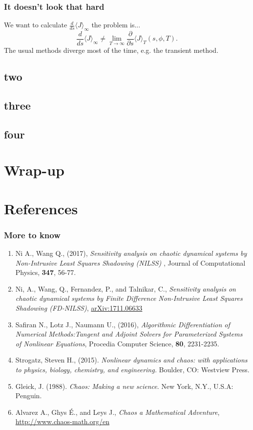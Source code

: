 \documentclass{beamer}
\begin{document}
\begin{frame}
  \frametitle{It doesn't look that hard}
  We want to calculate $\frac{d}{ds}\langle J \rangle_\infty $ the problem is...\pause
  \begin{equation}
    \frac{d}{ds} \langle J \rangle_\infty \neq \lim_{T\rightarrow \infty} \frac{\partial}{\partial s} \langle J \rangle_T (s,\phi,T).
  \end{equation}
  \pause
  The usual methods diverge most of the time, e.g. the transient method.
\end{frame}
\subsection{two}
\subsection{three}
\subsection{four}

\section{Wrap-up}

\section{References}
\begin{frame}
  \frametitle{More to know}
  \begin{scriptsize}
  \begin{enumerate}
    \item Ni A., Wang Q., (2017), \textit{Sensitivity analysis on chaotic dynamical systems by Non-Intrusive Least Squares Shadowing (NILSS)} , Journal of Computational Physics, \textbf{347}, 56-77.
    \item {Ni}, A., {Wang}, Q., {Fernandez}, P., and {Talnikar}, C., \textit{Sensitivity analysis on chaotic dynamical systems by Finite Difference Non-Intrusive Least Squares Shadowing (FD-NILSS)}, \url{arXiv:1711.06633}
    \item Safiran N., Lotz J., Naumann U., (2016), \textit{Algorithmic Differentiation of Numerical Methods:Tangent and Adjoint Solvers for Parameterized Systems of Nonlinear Equations}, Procedia Computer Science, \textbf{80}, 2231-2235.
    \item Strogatz, Steven H., (2015). \textit{Nonlinear dynamics and chaos: with applications to physics, biology, chemistry, and engineering.} Boulder, CO: Westview Press.
    \item Gleick, J. (1988). \textit{Chaos: Making a new science}. New York, N.Y., U.S.A: Penguin.
    \item Alvarez A., Ghys É., and Leys J., \textit{Chaos a Mathematical Adventure}, \url{http://www.chaos-math.org/en}
  \end{enumerate}
\end{scriptsize}
\end{frame}
\end{document}
